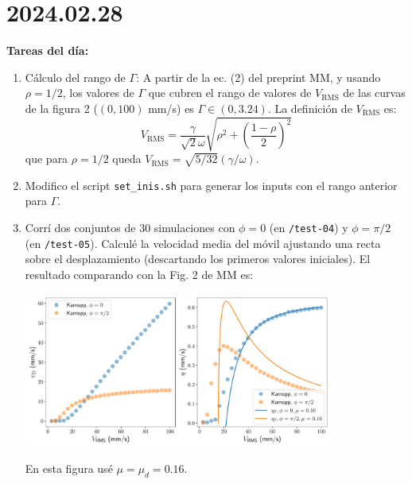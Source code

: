 \documentclass[11pt]{article}
\begin{document}
\section*{2024.02.28}
\textbf{Tareas del día:}
\begin{enumerate}
    \item Cálculo del rango de $\Gamma$: A partir de la ec. (2) del preprint MM, y usando $\rho = 1/2$, los valores de $\Gamma$ que cubren el rango de valores de $V_{\text{RMS}}$ de las curvas de la figura 2 ($(0, 100)$ \unit{mm/s}) es $\Gamma \in (0, 3.24)$. La definición de $V_{\text{RMS}}$ es:
        \[ V_{\text{RMS}} = \frac{\gamma}{\sqrt{2} \omega} \sqrt{\rho^2 + \left(\frac{1 - \rho}{2}\right)^2} \]
        que para $\rho=1/2$ queda $V_{\text{RMS}} = \sqrt{5/32}(\gamma/\omega)$.
    \item Modifico el script \texttt{set\_inis.sh} para generar los inputs con el rango anterior para $\Gamma$.
    \item Corrí dos conjuntos de 30 simulaciones con $\phi = 0$ (en \texttt{/test-04}) y $\phi = \pi/2$ (en \texttt{/test-05}). Calculé la velocidad media del móvil ajustando una recta sobre el desplazamiento (descartando los primeros valores iniciales). El resultado comparando con la Fig. 2 de MM es: 
        \begin{center}
            \includegraphics[width=0.8\textwidth]{figs/Fig_2_MM.pdf}
            \label{fig:2MM}
        \end{center}
        En esta figura usé $\mu = \mu_d = 0.16$.
\end{enumerate}
\end{document}
